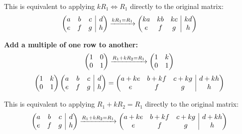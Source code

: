 \documentclass{article}
\begin{document}
\par \noindent This is equivalent to applying \(kR_1 \Leftrightarrow R_1\) directly to the original matrix:
\[
\left(\begin{array}{@{}ccc|c@{}}
	a & b & c & d \\
	e & f & g & h
\end{array}\right)
 \xrightarrow[]{kR_1 = R_1}
\left(\begin{array}{@{}ccc|c@{}}
	ka & kb & kc & kd \\
	e & f & g & h
\end{array}\right)
\]
\par \noindent \textbf{Add a multiple of one row to another:}
\newline
\[
 \left(\begin{array}{@{}cc@{}}
	1 & 0 \\
	0 & 1 
\end{array}\right)
 \xrightarrow[]{R_1 + kR_2 = R_1}
  \left(\begin{array}{@{}cc@{}}
	1 & k \\
	0 & 1 
\end{array}\right)
 \]
  \[
   \left(\begin{array}{@{}cc@{}}
	1 & k \\
	0 & 1 
\end{array}\right)
\left(\begin{array}{@{}ccc|c@{}}
	a & b & c & d \\
	e & f & g & h
\end{array}\right)=
\left(\begin{array}{@{}ccc|c@{}}
	a + ke & b+kf & c + kg & d+kh \\
	e & f & g & h
\end{array}\right)
\]
\par \noindent This is equivalent to applying \(R_1 + kR_2 = R_1\) directly to the original matrix:
\[
\left(\begin{array}{@{}ccc|c@{}}
	a & b & c & d \\
	e & f & g & h
\end{array}\right)
 \xrightarrow[]{R_1 + kR_2 = R_1}
\left(\begin{array}{@{}ccc|c@{}}
	a + ke & b+kf & c + kg & d+kh \\
	e & f & g & h
\end{array}\right)
\]
\end{document}
